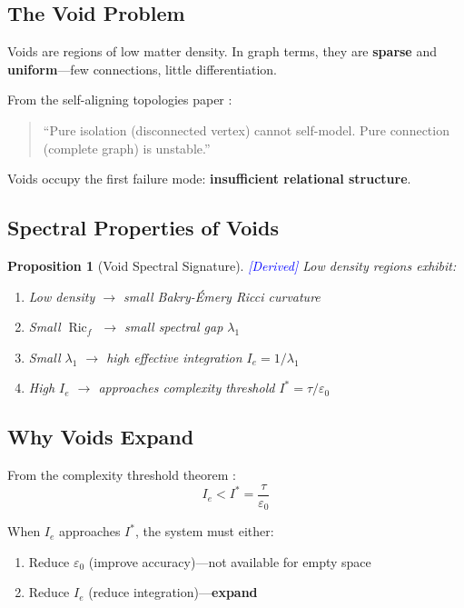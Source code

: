 \documentclass[11pt,a4paper]{article}
\theoremstyle{plain}
\newtheorem{proposition}[theorem]{Proposition}
\theoremstyle{definition}
\theoremstyle{remark}
\newcommand{\Ric}{\operatorname{Ric}}
\newcommand{\derived}{\textcolor{blue}{[Derived]}}
\begin{document}
\subsection{The Void Problem}

Voids are regions of low matter density. In graph terms, they are \textbf{sparse} and \textbf{uniform}---few connections, little differentiation.

From the self-aligning topologies paper \cite{sat}:
\begin{quote}
``Pure isolation (disconnected vertex) cannot self-model. Pure connection (complete graph) is unstable.''
\end{quote}

Voids occupy the first failure mode: \textbf{insufficient relational structure}.

\subsection{Spectral Properties of Voids}

\begin{proposition}[Void Spectral Signature] \derived
Low density regions exhibit:
\begin{enumerate}[label=(\roman*),noitemsep]
    \item Low density $\to$ small Bakry-\'{E}mery Ricci curvature
    \item Small $\Ric_f$ $\to$ small spectral gap $\lambda_1$
    \item Small $\lambda_1$ $\to$ high effective integration $I_e = 1/\lambda_1$
    \item High $I_e$ $\to$ approaches complexity threshold $I^* = \tau/\varepsilon_0$
\end{enumerate}
\end{proposition}

\subsection{Why Voids Expand}

From the complexity threshold theorem \cite{spectral_unity}:
\[
I_e < I^* = \frac{\tau}{\varepsilon_0}
\]

When $I_e$ approaches $I^*$, the system must either:
\begin{enumerate}[noitemsep]
    \item Reduce $\varepsilon_0$ (improve accuracy)---not available for empty space
    \item Reduce $I_e$ (reduce integration)---\textbf{expand}
\end{enumerate}
\end{document}
